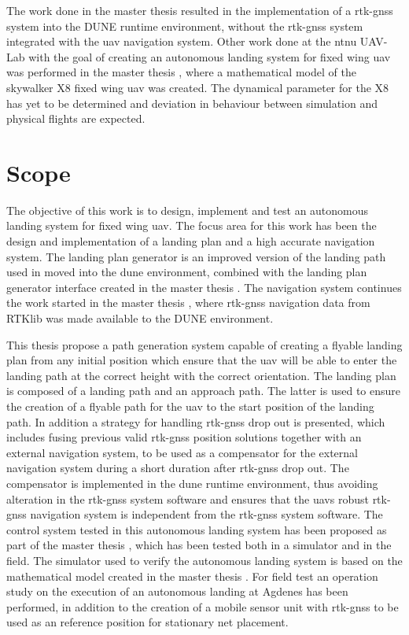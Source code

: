 The work done in the master thesis \citep{Spockeli} resulted in the implementation of a \gls{rtk-gnss} system into the DUNE runtime environment, without the \gls{rtk-gnss} system integrated with the \gls{uav} navigation system. Other work done at the \gls{ntnu} UAV-Lab with the goal of creating an autonomous landing system for fixed wing \gls{uav} was performed in the master thesis \citep{Gryte}, where a mathematical model of the skywalker X8 fixed wing \gls{uav} was created. The dynamical parameter for the X8 has yet to be determined and deviation in behaviour between simulation and physical flights are expected.
\section{Scope}
The objective of this work is to design, implement and test an autonomous landing system for fixed wing \gls{uav}. The focus area for this work has been the design and implementation of a landing plan and a high accurate navigation system. The landing plan generator is an improved version of the landing path used in \citep{Skulstad&Syversen} moved into the \gls{dune} environment, combined with the landing plan generator interface created in the master thesis \citep{Froelich}. The navigation system continues the work started in the master thesis \citep{Spockeli}, where \gls{rtk-gnss} navigation data from RTKlib was made available to the DUNE environment.

This thesis propose a path generation system capable of creating a flyable landing plan from any initial position which ensure that the \gls{uav} will be able to enter the landing path at the correct height with the correct orientation. The landing plan is composed of a landing path and an approach path. The latter is used to ensure the creation of a flyable path for the \gls{uav} to the start position of the landing path. In addition a strategy for handling \gls{rtk-gnss} drop out is presented, which includes fusing previous valid \gls{rtk-gnss} position solutions together with an external navigation system, to be used as a compensator for the external navigation system during a short duration after \gls{rtk-gnss} drop out. The compensator is implemented in the \gls{dune} runtime environment, thus avoiding alteration in the \gls{rtk-gnss} system software and ensures that the \gls{uav}s robust \gls{rtk-gnss} navigation system is independent from the \gls{rtk-gnss} system software. The control system tested in this autonomous landing system has been proposed as part of the master thesis \citep{Sigurd}, which has been tested both in a simulator and in the field. The simulator used to verify the autonomous landing system is based on the mathematical model created in the master thesis \citep{Gryte}. For field test an operation study on the execution of an autonomous landing at Agdenes has been performed, in addition to the creation of a mobile sensor unit with \gls{rtk-gnss} to be used as an reference position for stationary net placement.
